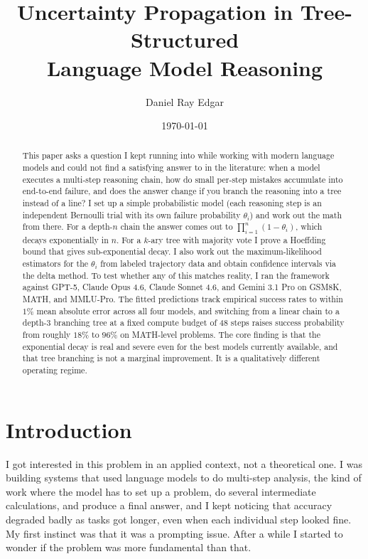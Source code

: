 \documentclass[11pt]{article}
\title{%
  \vspace{-0.5cm}
  \textbf{Uncertainty Propagation in Tree-Structured}\\[2pt]
  \textbf{Language Model Reasoning}
  \vspace{0.3cm}
}
\author{Daniel Ray Edgar}
\date{\normalsize\today}
\theoremstyle{plain}
\theoremstyle{definition}
\begin{document}
\maketitle
\thispagestyle{empty}

\begin{abstract}
This paper asks a question I kept running into while working with modern language
models and could not find a satisfying answer to in the literature: when a model
executes a multi-step reasoning chain, how do small per-step mistakes accumulate
into end-to-end failure, and does the answer change if you branch the reasoning
into a tree instead of a line? I set up a simple probabilistic model (each
reasoning step is an independent Bernoulli trial with its own failure probability
$\theta_i$) and work out the math from there. For a depth-$n$ chain the answer
comes out to $\prod_{i=1}^n(1-\theta_i)$, which decays exponentially in $n$. For
a $k$-ary tree with majority vote I prove a Hoeffding bound that gives
sub-exponential decay. I also work out the maximum-likelihood estimators for the
$\theta_i$ from labeled trajectory data and obtain confidence intervals via the
delta method. To test whether any of this matches reality, I ran the framework
against GPT-5, Claude Opus 4.6, Claude Sonnet 4.6, and Gemini 3.1 Pro on
GSM8K, MATH, and MMLU-Pro. The fitted predictions track empirical success rates
to within $1\%$ mean absolute error across all four models, and switching from a
linear chain to a depth-3 branching tree at a fixed compute budget of 48 steps
raises success probability from roughly $18\%$ to $96\%$ on MATH-level problems.
The core finding is that the exponential decay is real and severe even for the
best models currently available, and that tree branching is not a marginal
improvement. It is a qualitatively different operating regime.
\end{abstract}

\newpage
\setcounter{page}{1}

\section{Introduction}
\label{sec:intro}

I got interested in this problem in an applied context, not a theoretical one.
I was building systems that used language models to do multi-step analysis, the
kind of work where the model has to set up a problem, do several intermediate
calculations, and produce a final answer, and I kept noticing that accuracy
degraded badly as tasks got longer, even when each individual step looked fine.
My first instinct was that it was a prompting issue. After a while I started
to wonder if the problem was more fundamental than that.
\end{document}
